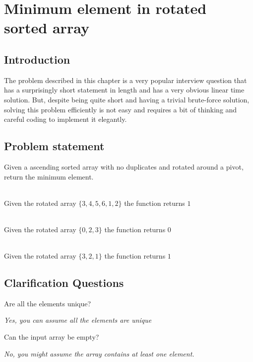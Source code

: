 %

\chapter{Minimum element in rotated sorted array}
\label{ch:min_rotated_array}
\section*{Introduction}
The problem described in this chapter is a very popular interview question that has a surprisingly short statement in length and has a very obvious linear time solution. But, despite being quite short and having a trivial  brute-force solution, solving this problem efficiently is not easy and requires a bit of thinking and careful coding to implement it elegantly. 

\section{Problem statement}
\begin{exercise}
Given a ascending sorted array with no duplicates and rotated around a pivot, return the minimum element.
\end{exercise}


\begin{example}
	\hfill \\
	Given the rotated array $\{3,4,5,6,1,2\}$ the function returns $1$
\end{example}

\begin{example}
	\hfill \\
	Given the rotated array $\{0,2,3\}$ the function returns $0$
\end{example}

\begin{example}
	\hfill \\
	Given the rotated array $\{3,2,1\}$ the function returns $1$
\end{example}

\section{Clarification Questions}

\begin{QandA}
	\item Are all the elements unique? 
	\begin{answered}
		\textit{Yes, you can assume all the elements are unique}
	\end{answered}
	\item Can the input array be empty?
	\begin{answered}
		\textit{No, you might assume the array contains at least one element.}
	\end{answered}
\end{QandA}

